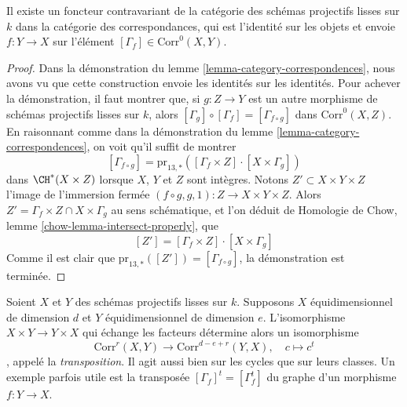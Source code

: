 \begin{lemma}
\label{lemma-contravariant-functor}
Il existe un foncteur contravariant de la catégorie des schémas
projectifs lisses sur $k$ dans la catégorie des correspondances,
qui est l'identité sur les objets et envoie $f : Y \to X$ sur
l'élément $[\Gamma_f] \in \text{Corr}^0(X, Y)$.
\end{lemma}

\begin{proof}
Dans la démonstration du lemme \ref{lemma-category-correspondences},
nous avons vu que cette construction envoie les identités sur
les identités. Pour achever la démonstration, il faut montrer que, si $g : Z \to Y$
est un autre morphisme de schémas projectifs lisses sur $k$, alors
$[\Gamma_g] \circ [\Gamma_f] = [\Gamma_{f \circ g}]$ dans
$\text{Corr}^0(X, Z)$. En raisonnant comme dans la démonstration du
lemme \ref{lemma-category-correspondences}, on voit qu'il
suffit de montrer
$$
[\Gamma_{f \circ g}] =
\text{pr}_{13, *}([\Gamma_f \times Z] \cdot [X \times \Gamma_g])
$$
dans $\CH^*(X \times Z)$ lorsque $X$, $Y$ et $Z$ sont intègres.
Notons $Z' \subset X \times Y \times Z$ l'image de l'immersion fermée
$(f \circ g, g, 1) : Z \to X \times Y \times Z$.
Alors $Z' = \Gamma_f \times Z \cap X \times \Gamma_g$
au sens schématique, et l'on déduit de
Homologie de Chow, lemme \ref{chow-lemma-intersect-properly},
que
$$
[Z'] = [\Gamma_f \times Z] \cdot [X \times \Gamma_g]
$$
Comme il est clair que $\text{pr}_{13, *}([Z']) = [\Gamma_{f \circ g}]$,
la démonstration est terminée.
\end{proof}

\begin{remark}
\label{remark-transpose}
Soient $X$ et $Y$ des schémas projectifs lisses sur $k$.
Supposons $X$ équidimensionnel de dimension $d$ et
$Y$ équidimensionnel de dimension $e$. L'isomorphisme
$X \times Y \to Y \times X$ qui échange les facteurs détermine alors
un isomorphisme
$$
\text{Corr}^r(X, Y) \longrightarrow \text{Corr}^{d - e + r}(Y, X),\quad
c \longmapsto c^t
$$,
appelé la {\it transposition}. Il agit aussi bien sur les cycles que sur leurs classes.
Un exemple parfois utile est la transposée
$[\Gamma_f]^t = [\Gamma_f^t]$ du graphe d'un morphisme $f : Y \to X$.
\end{remark}

